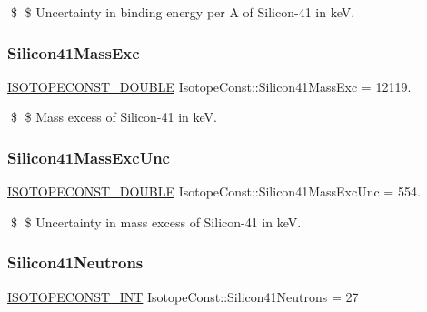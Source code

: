 \$ \$ Uncertainty in binding energy per A of Silicon-\/41 in keV. \mbox{\label{group___isotope_const-_silicon-_si41_gac45bc95b626d4ece30e62665ed603b64}} 
\subsubsection{\texorpdfstring{Silicon41\+Mass\+Exc}{Silicon41MassExc}}
{\footnotesize\ttfamily \mbox{\hyperlink{group___isotope_const-_macros_ga8f45a7272ce02c0b4c65c44636ed719a}{I\+S\+O\+T\+O\+P\+E\+C\+O\+N\+S\+T\+\_\+\+D\+O\+U\+B\+LE}} Isotope\+Const\+::\+Silicon41\+Mass\+Exc = 12119.}

\$ \$ Mass excess of Silicon-\/41 in keV. \mbox{\label{group___isotope_const-_silicon-_si41_ga679af1fa8105957018b608b566567dc5}} 
\subsubsection{\texorpdfstring{Silicon41\+Mass\+Exc\+Unc}{Silicon41MassExcUnc}}
{\footnotesize\ttfamily \mbox{\hyperlink{group___isotope_const-_macros_ga8f45a7272ce02c0b4c65c44636ed719a}{I\+S\+O\+T\+O\+P\+E\+C\+O\+N\+S\+T\+\_\+\+D\+O\+U\+B\+LE}} Isotope\+Const\+::\+Silicon41\+Mass\+Exc\+Unc = 554.}

\$ \$ Uncertainty in mass excess of Silicon-\/41 in keV. \mbox{\label{group___isotope_const-_silicon-_si41_gaba43c6ff4dcd6c4170b66116fb0302aa}} 
\subsubsection{\texorpdfstring{Silicon41\+Neutrons}{Silicon41Neutrons}}
{\footnotesize\ttfamily \mbox{\hyperlink{group___isotope_const-_macros_ga5f18360b3e99483a35c32d789e62621c}{I\+S\+O\+T\+O\+P\+E\+C\+O\+N\+S\+T\+\_\+\+I\+NT}} Isotope\+Const\+::\+Silicon41\+Neutrons = 27}

